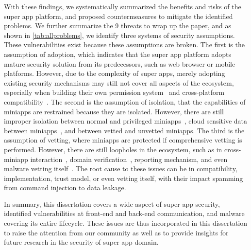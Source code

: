 \documentclass{osudissert96}
\begin{document}
With these findings, we systematically summarized the benefits and risks of the super app platform, and proposed countermeasures to mitigate the identified problems. We further summarize the 9 threats to wrap up the paper, and as shown in \autoref{tab:allproblems}, we identify three systems of security assumptions. These vulnerabilities exist because these assumptions are broken. The first is the assumption of adoption, which indicates that the super app platform adopts mature security solution from its predecessors, such as web browser or mobile platforms. However, due to the complexity of super apps, merely adopting existing security mechanisms may still not cover all aspects of the ecosystem, especially when building their own permission system~\cite{lu2020} and cross-platform compatibility~\cite{crossplatform2023}. The second is the assumption of isolation, that the capabilities of miniapps are restrained because they are isolated. However, there are still improper isolation between normal and privileged miniapps~\cite{hiddenAPI2023}, cloud sensitive data between miniapps~\cite{appsecretleak}, and between vetted and unvetted miniapps. The third is the assumption of vetting, where miniapps are protected if comprehensive vetting is performed. However, there are still loopholes in the ecosystem, such as in cross-miniapp interaction~\cite{cmrf}, domain verification~\cite{zhang2023trusteddomain}, reporting mechanism, and even malware vetting itself~\cite{minimalware}. The root cause to these issues can be in compatibility, implementation, trust model, or even vetting itself, with their impact spamming from command injection to data leakage.

In summary, this dissertation covers a wide aspect of super app security, identified vulnerabilities at front-end and back-end communication, and malware covering its entire lifecycle. These issues are thus incorporated in this dissertation to raise the attention from our community as well as to provide insights for future research in the security of super app domain.


\end{document}
